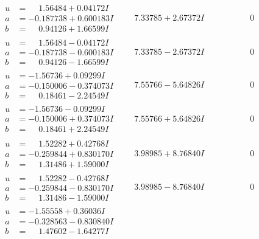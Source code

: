 \documentclass[1p]{elsarticle_modified}
\theoremstyle{definition}
\begin{document}
$$\begin{array}{c|c|c}
\begin{aligned}
u &= \phantom{-}1.56484 + 0.04172 I \\
a &= -0.187738 + 0.600183 I \\
b &= \phantom{-}0.94126 + 1.66599 I\end{aligned}
 & \phantom{-}7.33785 + 2.67372 I & \phantom{-0.000000 } 0 \\ \hline\begin{aligned}
u &= \phantom{-}1.56484 - 0.04172 I \\
a &= -0.187738 - 0.600183 I \\
b &= \phantom{-}0.94126 - 1.66599 I\end{aligned}
 & \phantom{-}7.33785 - 2.67372 I & \phantom{-0.000000 } 0 \\ \hline\begin{aligned}
u &= -1.56736 + 0.09299 I \\
a &= -0.150006 - 0.374073 I \\
b &= \phantom{-}0.18461 - 2.24549 I\end{aligned}
 & \phantom{-}7.55766 - 5.64826 I & \phantom{-0.000000 } 0 \\ \hline\begin{aligned}
u &= -1.56736 - 0.09299 I \\
a &= -0.150006 + 0.374073 I \\
b &= \phantom{-}0.18461 + 2.24549 I\end{aligned}
 & \phantom{-}7.55766 + 5.64826 I & \phantom{-0.000000 } 0 \\ \hline\begin{aligned}
u &= \phantom{-}1.52282 + 0.42768 I \\
a &= -0.259844 + 0.830170 I \\
b &= \phantom{-}1.31486 + 1.59000 I\end{aligned}
 & \phantom{-}3.98985 + 8.76840 I & \phantom{-0.000000 } 0 \\ \hline\begin{aligned}
u &= \phantom{-}1.52282 - 0.42768 I \\
a &= -0.259844 - 0.830170 I \\
b &= \phantom{-}1.31486 - 1.59000 I\end{aligned}
 & \phantom{-}3.98985 - 8.76840 I & \phantom{-0.000000 } 0 \\ \hline\begin{aligned}
u &= -1.55558 + 0.36036 I \\
a &= -0.328563 - 0.830840 I \\
b &= \phantom{-}1.47602 - 1.64277 I\end{aligned}

\end{array}$$
\end{document}
